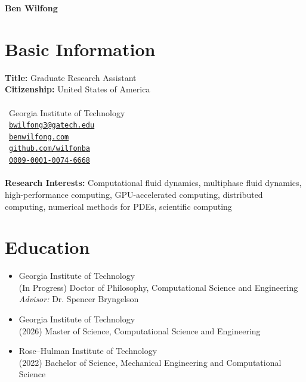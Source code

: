 \documentclass{article}
\begin{document}
\begin{center}
    \LARGE{\textbf{Ben Wilfong}}
\end{center}

\section{Basic Information}
\textbf{Title:} Graduate Research Assistant \\
\textbf{Citizenship:} United States of America \\~\\
\faBuilding\ Georgia Institute of Technology \\
\faEnvelopeSquare\ \href{mailto:bwilfong3@gatech.edu}{\texttt{bwilfong3@gatech.edu}} \\
\faArrowAltCircleRight\  \href{https://benwilfong.com}{\texttt{benwilfong.com}} \\
\faGithub\ \href{https://github.com/wilfonba}{\texttt{github.com/wilfonba}} \\
\faOrcid\ \href{https://orcid.org/0009-0001-0074-6668}{\texttt{0009-0001-0074-6668}} \\~\\
\textbf{Research Interests:} Computational fluid dynamics, multiphase fluid dynamics, high-performance computing, GPU-accelerated computing, distributed computing, numerical methods for PDEs, scientific computing

\section{Education}
\begin{itemize}[itemsep=-10pt]
    \item[\faGraduationCap] Georgia Institute of Technology \\
    \hspace*{0.25cm} (In Progress) Doctor of Philosophy, Computational Science and Engineering \\
    \hspace*{2.4cm} \textit{Advisor:} Dr. Spencer Bryngelson \\
    \item[\faGraduationCap] Georgia Institute of Technology \\
    \hspace*{0.25cm} (2026) Master of Science, Computational Science and Engineering \\
    \item[\faGraduationCap] Rose--Hulman Institute of Technology \\
    \hspace*{0.25cm} (2022) Bachelor of Science, Mechanical Engineering and Computational Science
\end{itemize}
\end{document}
